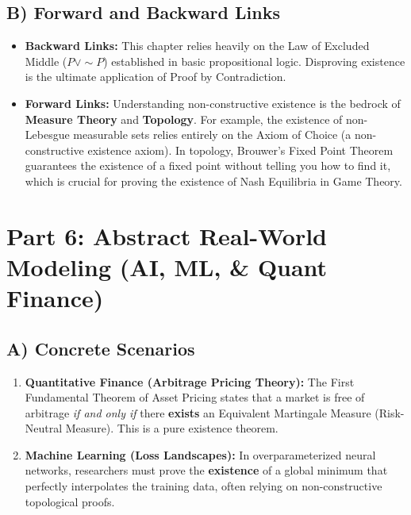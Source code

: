 \documentclass[11pt, a4paper]{article}
\theoremstyle{definition}
\theoremstyle{remark}
\begin{document}
\subsection{B) Forward and Backward Links}
\begin{itemize}
    \item \textbf{Backward Links:} This chapter relies heavily on the Law of Excluded Middle ($P \lor \sim P$) established in basic propositional logic. Disproving existence is the ultimate application of Proof by Contradiction.
    \item \textbf{Forward Links:} Understanding non-constructive existence is the bedrock of \textbf{Measure Theory} and \textbf{Topology}. For example, the existence of non-Lebesgue measurable sets relies entirely on the Axiom of Choice (a non-constructive existence axiom). In topology, Brouwer's Fixed Point Theorem guarantees the existence of a fixed point without telling you how to find it, which is crucial for proving the existence of Nash Equilibria in Game Theory.
\end{itemize}

\section{Part 6: Abstract Real-World Modeling (AI, ML, \& Quant Finance)}

\subsection{A) Concrete Scenarios}
\begin{enumerate}
    \item \textbf{Quantitative Finance (Arbitrage Pricing Theory):} The First Fundamental Theorem of Asset Pricing states that a market is free of arbitrage \textit{if and only if} there \textbf{exists} an Equivalent Martingale Measure (Risk-Neutral Measure). This is a pure existence theorem.
    \item \textbf{Machine Learning (Loss Landscapes):} In overparameterized neural networks, researchers must prove the \textbf{existence} of a global minimum that perfectly interpolates the training data, often relying on non-constructive topological proofs.
\end{enumerate}
\end{document}
